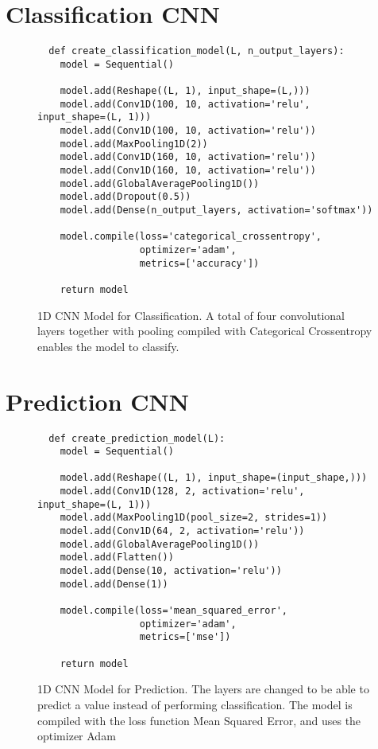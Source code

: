 \section{Classification CNN}
\begin{figure}[!ht]
\begin{code}
  \begin{verbatim}
  def create_classification_model(L, n_output_layers):
    model = Sequential()

    model.add(Reshape((L, 1), input_shape=(L,)))
    model.add(Conv1D(100, 10, activation='relu', input_shape=(L, 1)))
    model.add(Conv1D(100, 10, activation='relu'))
    model.add(MaxPooling1D(2))
    model.add(Conv1D(160, 10, activation='relu'))
    model.add(Conv1D(160, 10, activation='relu'))
    model.add(GlobalAveragePooling1D())
    model.add(Dropout(0.5))
    model.add(Dense(n_output_layers, activation='softmax'))

    model.compile(loss='categorical_crossentropy', 
                  optimizer='adam', 
                  metrics=['accuracy'])

    return model
  \end{verbatim}
  \caption{1D CNN Model for Classification. A total of four convolutional layers together with pooling compiled with Categorical Crossentropy enables the model to classify.}
  \label{code:1d_conv_net_classifier}
\end{code}
\end{figure}

\newpage

\section{Prediction CNN}
\begin{figure}[!ht]
\begin{code}
  \begin{verbatim}
  def create_prediction_model(L):
    model = Sequential()

    model.add(Reshape((L, 1), input_shape=(input_shape,)))
    model.add(Conv1D(128, 2, activation='relu', input_shape=(L, 1)))
    model.add(MaxPooling1D(pool_size=2, strides=1))
    model.add(Conv1D(64, 2, activation='relu'))
    model.add(GlobalAveragePooling1D())
    model.add(Flatten())
    model.add(Dense(10, activation='relu'))
    model.add(Dense(1))
    
    model.compile(loss='mean_squared_error', 
                  optimizer='adam', 
                  metrics=['mse'])

    return model
  \end{verbatim}
  \caption{1D CNN Model for Prediction. The layers are changed to be able to predict a value instead of performing classification. The model is compiled with the loss function Mean Squared Error, and uses the optimizer Adam}
  \label{code:1d_conv_net_predictor}
\end{code}
\end{figure}